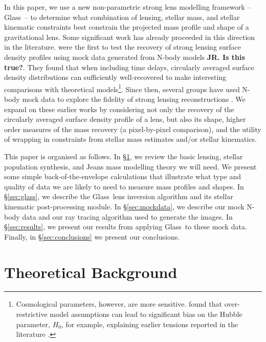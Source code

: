 \documentclass[galley,usenatbib]{mn2e}
\newcommand{\Glass}{{\sc Glass}}
\newcommand{\secref}[1] {\S\ref{#1}}
\begin{document}
In this paper, we use a new non-parametric strong lens modelling framework -- 
\Glass\ -- to determine what combination of lensing, stellar mass, and
stellar kinematic constraints best constrain the projected mass profile and
shape of a gravitational lens. Some significant work has already proceeded in this direction in the literature.
\citet{2007ApJ...667..645R} were the first to test the recovery of strong
lensing surface density profiles using mock data generated from N-body models
{\bf JR. Is this true?}. They found that when including time delays, circularly
averaged surface density distributions can sufficiently well-recovered to make
interesting comparisons with theoretical models\footnote{Cosmological
parameters, however, are more sensitive. \citet{2007ApJ...667..645R} found that
over-restrictive model assumptions can lead to significant bias on the Hubble
parameter, $H_0$, for example, explaining earlier tensions reported in the
literature \citep[e.g.][]{2002ApJ...578...25K,2002astro.ph..4043K}.}. Since then, several groups
have used N-body mock data to explore the fidelity of strong lensing
reconstructions \citep{2007MNRAS.380.1729L, CITES}. We expand on these earlier
works by considering not only the recovery of the circularly averaged surface density profile
of a lens, but also its shape, higher order measures of the mass recovery (a
pixel-by-pixel comparison), and the utility of wrapping in
constraints from stellar mass estimates and/or stellar kinematics.

This paper is organised as follows. In \secref{sec:theory}, we review the basic
lensing, stellar population synthesis, and Jeans mass modelling theory we will
need. We present some simple back-of-the-envelope calculations that illustrate
what type and quality of data we are likely to need to measure mass profiles
and shapes. In \secref{sec:glass}, we describe the \Glass\ lens inversion
algorithm and its stellar kinematic post-processing module. In
\secref{sec:mockdata}, we describe our mock N-body data and our ray tracing
algorithm used to generate the images. In \secref{sec:results}, we present our
results from applying \Glass\ to these mock data. Finally, in
\secref{sec:conclusions} we present our conclusions. 

\section{Theoretical Background}\label{sec:theory} %
\end{document}
